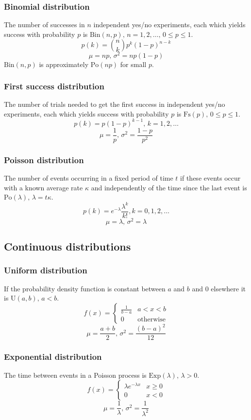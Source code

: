 \subsubsection{Binomial distribution}
The number of successes in $n$ independent yes/no experiments, each which yields success with probability $p$ is $\textrm{Bin}(n,p),\,n=1,2,\dots,\, 0\leq p\leq1$.
\[p(k)=\binom{n}{k}p^k(1-p)^{n-k}\]
\[\mu = np,\,\sigma^2=np(1-p)\]
$\textrm{Bin}(n,p)$ is approximately $\textrm{Po}(np)$ for small $p$.

\subsubsection{First success distribution}
The number of trials needed to get the first success in independent yes/no experiments, each which yields success with probability $p$ is $\textrm{Fs}(p),\,0\leq p\leq1$.
\[p(k)=p(1-p)^{k-1},\,k=1,2,\dots\]
\[\mu = \frac1p,\,\sigma^2=\frac{1-p}{p^2}\]

\subsubsection{Poisson distribution}
The number of events occurring in a fixed period of time $t$ if these events occur with a known average rate $\kappa$ and independently of the time since the last event is $\textrm{Po}(\lambda),\,\lambda=t\kappa$.
\[p(k)=e^{-\lambda}\frac{\lambda^k}{k!}, k=0,1,2,\dots\]
\[\mu=\lambda,\,\sigma^2=\lambda\]

\subsection{Continuous distributions}

\subsubsection{Uniform distribution}
If the probability density function is constant between $a$ and $b$ and 0 elsewhere it is $\textrm{U}(a,b),\,a<b$.
\[f(x) = \left\{
\begin{array}{cl}
\frac{1}{b-a} & a<x<b\\
0 & \textrm{otherwise}
\end{array}\right.\]
\[\mu=\frac{a+b}{2},\,\sigma^2=\frac{(b-a)^2}{12}\]

\subsubsection{Exponential distribution}
The time between events in a Poisson process is $\textrm{Exp}(\lambda),\,\lambda>0$.
\[f(x) = \left\{
\begin{array}{cl}
\lambda e^{-\lambda x} & x\geq0\\
0 & x<0
\end{array}\right.\]
\[\mu=\frac{1}{\lambda},\,\sigma^2=\frac{1}{\lambda^2}\]

